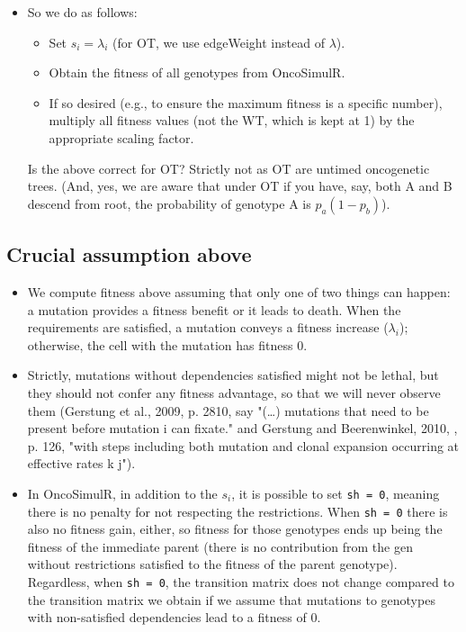 \documentclass[11pt]{article}
\begin{document}
\begin{itemize}
\item So we do as follows:
\begin{itemize}
\item Set \(s_i = \lambda_i\) (for OT, we use edgeWeight instead of \(\lambda\)).
\item Obtain the fitness of all genotypes from OncoSimulR.
\item If so desired (e.g., to ensure the maximum fitness is a specific number),  multiply all fitness values (not the WT, which is kept at 1) by the appropriate scaling factor.
\end{itemize}

Is the above correct for OT? Strictly not as OT are untimed oncogenetic trees. (And, yes, we are aware that under OT if you have, say, both A and B descend from root, the probability of genotype A is $p_a (1 - p_b)$).
\end{itemize}


\subsection{Crucial assumption above}
\label{sec:org57fee67}
\begin{itemize}
\item We compute fitness above assuming that only one of two things can happen: a mutation provides a fitness benefit or it leads to death. When the requirements are satisfied, a mutation conveys a fitness increase (\(\lambda_i\)); otherwise, the cell with the mutation has fitness 0.

\item Strictly, mutations without dependencies satisfied might not be lethal, but they should not confer any fitness advantage, so that we will never observe them (Gerstung et al., 2009, p. 2810, say "(\ldots{}) mutations that need to be present before mutation i can fixate." and Gerstung and Beerenwinkel, 2010, , p. 126, "with steps including both mutation and clonal expansion occurring at effective rates k j").

\item In OncoSimulR, in addition to the \(s_i\), it is possible to set \texttt{sh = 0}, meaning there is no penalty for not respecting the restrictions. When \texttt{sh = 0} there is also no fitness gain, either, so fitness for those genotypes ends up being the fitness of the immediate parent (there is no contribution from the gen without restrictions satisfied to the fitness of the parent genotype). Regardless, when \texttt{sh = 0}, the transition matrix does not change compared to the transition matrix we obtain if we assume that mutations to genotypes with non-satisfied dependencies lead to a fitness of 0.
\end{itemize}
\end{document}
